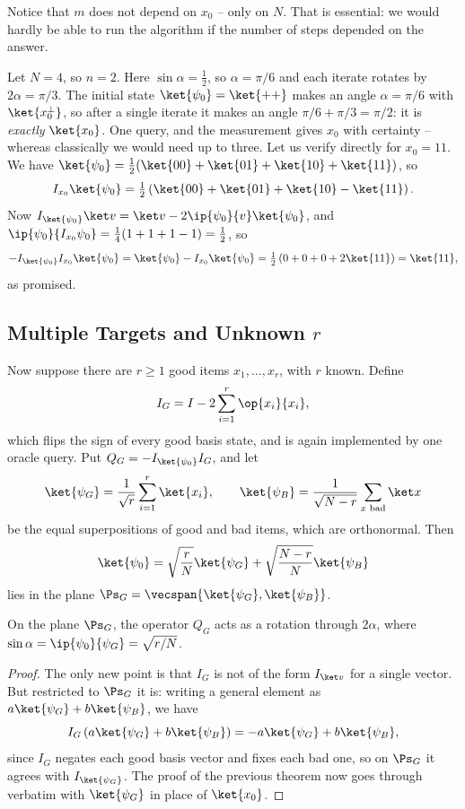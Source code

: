 Notice that $m$ does not depend on $x_0$ -- only on $N$. That is essential: we would hardly be able to run the algorithm if the number of steps depended on the answer.

\begin{example}
	Let $N = 4$, so $n = 2$. Here $\sin\alpha = \tfrac12$, so $\alpha = \pi/6$ and each iterate rotates by $2\alpha = \pi/3$. The initial state $\ket{\psi_0} = \ket{++}$ makes an angle $\alpha = \pi/6$ with $\ket{x_0^\perp}$, so after a single iterate it makes an angle $\pi/6+\pi/3 = \pi/2$: it is \emph{exactly} $\ket{x_0}$. One query, and the measurement gives $x_0$ with certainty -- whereas classically we would need up to three. Let us verify directly for $x_0 = 11$. We have $\ket{\psi_0} = \tfrac12(\ket{00}+\ket{01}+\ket{10}+\ket{11})$, so
	$$I_{x_0}\ket{\psi_0} = \tfrac12\left(\ket{00}+\ket{01}+\ket{10}-\ket{11}\right).$$
	Now $I_{\ket{\psi_0}}\ket v = \ket v - 2\ip{\psi_0}{v}\ket{\psi_0}$, and $\ip{\psi_0}{I_{x_0}\psi_0} = \tfrac14(1+1+1-1) = \tfrac12$, so
	$$-I_{\ket{\psi_0}}I_{x_0}\ket{\psi_0} = \ket{\psi_0} - I_{x_0}\ket{\psi_0} = \tfrac12\left(0+0+0+2\ket{11}\right) = \ket{11},$$
	as promised.
\end{example}

\subsection{Multiple Targets and Unknown \texorpdfstring{$r$}{r}}

Now suppose there are $r\geq1$ good items $x_1,\dots,x_r$, with $r$ known. Define
$$I_G = I - 2\sum_{i=1}^r\op{x_i}{x_i},$$
which flips the sign of every good basis state, and is again implemented by one oracle query. Put $Q_G = -I_{\ket{\psi_0}}I_G$, and let
$$\ket{\psi_G} = \frac1{\sqrt r}\sum_{i=1}^r\ket{x_i}, \qquad \ket{\psi_B} = \frac1{\sqrt{N-r}}\sum_{x \text{ bad}}\ket x$$
be the equal superpositions of good and bad items, which are orthonormal. Then
$$\ket{\psi_0} = \sqrt{\frac rN}\ket{\psi_G}+\sqrt{\frac{N-r}{N}}\ket{\psi_B}$$
lies in the plane $\Ps_G = \vecspan\{\ket{\psi_G},\ket{\psi_B}\}$.

\begin{proposition}
	On the plane $\Ps_G$, the operator $Q_G$ acts as a rotation through $2\alpha$, where $\sin\alpha = \ip{\psi_0}{\psi_G} = \sqrt{r/N}$.
\end{proposition}

\begin{proof}
	The only new point is that $I_G$ is not of the form $I_{\ket v}$ for a single vector. But restricted to $\Ps_G$ it is: writing a general element as $a\ket{\psi_G}+b\ket{\psi_B}$, we have
	$$I_G\left(a\ket{\psi_G}+b\ket{\psi_B}\right) = -a\ket{\psi_G}+b\ket{\psi_B},$$
	since $I_G$ negates each good basis vector and fixes each bad one, so on $\Ps_G$ it agrees with $I_{\ket{\psi_G}}$. The proof of the previous theorem now goes through verbatim with $\ket{\psi_G}$ in place of $\ket{x_0}$.
\end{proof}

